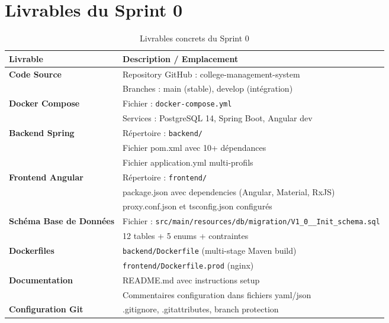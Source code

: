 \documentclass[12pt,a4paper]{report}
\begin{document}
\section{Livrables du Sprint 0}

\begin{table}[H]
\centering
\caption{Livrables concrets du Sprint 0}
\begin{tabular}{|p{5cm}|p{9.5cm}|}
\hline
\textbf{Livrable} & \textbf{Description / Emplacement} \\
\hline
\multirow{2}{*}{\textbf{Code Source}} & Repository GitHub : college-management-system \\
& Branches : main (stable), develop (intégration) \\
\hline
\multirow{2}{*}{\textbf{Docker Compose}} & Fichier : \texttt{docker-compose.yml} \\
& Services : PostgreSQL 14, Spring Boot, Angular dev \\
\hline
\multirow{3}{*}{\textbf{Backend Spring}} & Répertoire : \texttt{backend/} \\
& Fichier pom.xml avec 10+ dépendances \\
& Fichier application.yml multi-profils \\
\hline
\multirow{3}{*}{\textbf{Frontend Angular}} & Répertoire : \texttt{frontend/} \\
& package.json avec dependencies (Angular, Material, RxJS) \\
& proxy.conf.json et tsconfig.json configurés \\
\hline
\multirow{2}{*}{\textbf{Schéma Base de Données}} & Fichier : \texttt{src/main/resources/db/migration/V1\_0\_\_Init\_schema.sql} \\
& 12 tables + 5 enums + contraintes \\
\hline
\multirow{2}{*}{\textbf{Dockerfiles}} & \texttt{backend/Dockerfile} (multi-stage Maven build) \\
& \texttt{frontend/Dockerfile.prod} (nginx) \\
\hline
\multirow{2}{*}{\textbf{Documentation}} & README.md avec instructions setup \\
& Commentaires configuration dans fichiers yaml/json \\
\hline
\textbf{Configuration Git} & .gitignore, .gitattributes, branch protection \\
\hline
\end{tabular}
\end{table}

\newpage
\end{document}

